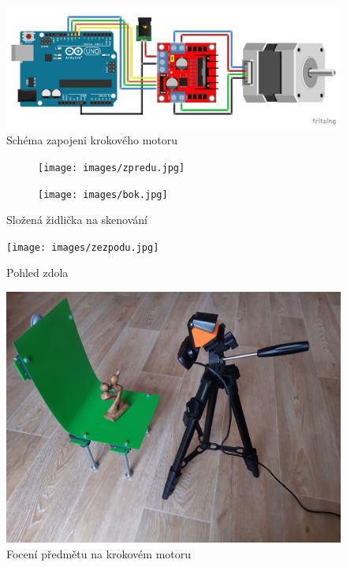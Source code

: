 \documentclass[12pt]{report}			%
\begin{document}
\begin{appendices}
        \begin{figure}[h]
    	    \centering
    	    \includegraphics[width = \textwidth]{images/zapojeni.jpg}
    	    \caption{Schéma zapojeni krokového motoru \cite{zapojeni}}
        \end{figure}

	    \begin{figure}[h]
            \centering
            \begin{subfigure}{8cm}
                \centering
                \texttt{[image: images/zpredu.jpg]}
            \end{subfigure}
            \hfill
            \begin{subfigure}{8cm}
                \centering
                \texttt{[image: images/bok.jpg]}
            \end{subfigure}
            \caption{Složená židlička na skenování}
        \end{figure}

    	\begin{figure}[h]
    	    \centering
    	    \texttt{[image: images/zezpodu.jpg]}
    	    \caption{Pohled zdola}
    	\end{figure}

        \begin{figure}[h]
            \centering
            \includegraphics[width =\textwidth]{images/foceniPredmetu.jpg}
            \caption{Focení předmětu na krokovém motoru}
        \end{figure}



\end{appendices}
\end{document}
